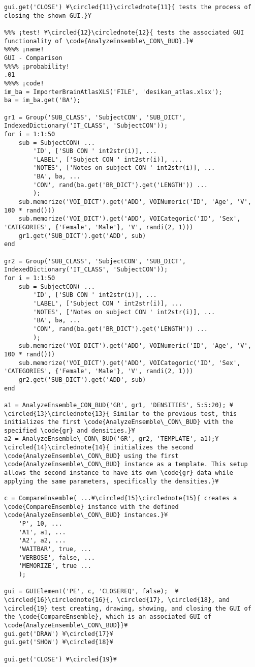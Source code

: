 \documentclass{tufte-handout}
\begin{document}
\begin{lstlisting}
gui.get('CLOSE') ¥\circled{11}\circlednote{11}{ tests the process of closing the shown GUI.}¥

%%% ¡test! ¥\circled{12}\circlednote{12}{ tests the associated GUI functionality of \code{AnalyzeEnsemble\_CON\_BUD}.}¥
%%%% ¡name!
GUI - Comparison
%%%% ¡probability!
.01
%%%% ¡code!
im_ba = ImporterBrainAtlasXLS('FILE', 'desikan_atlas.xlsx');
ba = im_ba.get('BA');

gr1 = Group('SUB_CLASS', 'SubjectCON', 'SUB_DICT', IndexedDictionary('IT_CLASS', 'SubjectCON'));
for i = 1:1:50
    sub = SubjectCON( ...
        'ID', ['SUB CON ' int2str(i)], ...
        'LABEL', ['Subject CON ' int2str(i)], ...
        'NOTES', ['Notes on subject CON ' int2str(i)], ...
        'BA', ba, ...
        'CON', rand(ba.get('BR_DICT').get('LENGTH')) ...
        );
    sub.memorize('VOI_DICT').get('ADD', VOINumeric('ID', 'Age', 'V', 100 * rand()))
    sub.memorize('VOI_DICT').get('ADD', VOICategoric('ID', 'Sex', 'CATEGORIES', {'Female', 'Male'}, 'V', randi(2, 1)))
    gr1.get('SUB_DICT').get('ADD', sub)
end

gr2 = Group('SUB_CLASS', 'SubjectCON', 'SUB_DICT', IndexedDictionary('IT_CLASS', 'SubjectCON'));
for i = 1:1:50
    sub = SubjectCON( ...
        'ID', ['SUB CON ' int2str(i)], ...
        'LABEL', ['Subject CON ' int2str(i)], ...
        'NOTES', ['Notes on subject CON ' int2str(i)], ...
        'BA', ba, ...
        'CON', rand(ba.get('BR_DICT').get('LENGTH')) ...
        );
    sub.memorize('VOI_DICT').get('ADD', VOINumeric('ID', 'Age', 'V', 100 * rand()))
    sub.memorize('VOI_DICT').get('ADD', VOICategoric('ID', 'Sex', 'CATEGORIES', {'Female', 'Male'}, 'V', randi(2, 1)))
    gr2.get('SUB_DICT').get('ADD', sub)
end

a1 = AnalyzeEnsemble_CON_BUD('GR', gr1, 'DENSITIES', 5:5:20); ¥\circled{13}\circlednote{13}{ Similar to the previous test, this initializes the first \code{AnalyzeEnsemble\_CON\_BUD} with the specified \code{gr} and densities.}¥
a2 = AnalyzeEnsemble\_CON\_BUD('GR', gr2, 'TEMPLATE', a1);¥\circled{14}\circlednote{14}{ initializes the second \code{AnalyzeEnsemble\_CON\_BUD} using the first \code{AnalyzeEnsemble\_CON\_BUD} instance as a template. This setup allows the second instance to have its own \code{gr} data while applying the same parameters, specifically the densities.}¥

c = CompareEnsemble( ...¥\circled{15}\circlednote{15}{ creates a \code{CompareEnsemble} instance with the defined \code{AnalyzeEnsemble\_CON\_BUD} instances.}¥
    'P', 10, ...
    'A1', a1, ...
    'A2', a2, ...
    'WAITBAR', true, ...
    'VERBOSE', false, ...
    'MEMORIZE', true ...
    );

gui = GUIElement('PE', c, 'CLOSEREQ', false);  ¥\circled{16}\circlednote{16}{, \circled{17}, \circled{18}, and \circled{19} test creating, drawing, showing, and closing the GUI of the \code{CompareEnsemble}, which is an associated GUI of \code{AnalyzeEnsemble\_CON\_BUD}}¥
gui.get('DRAW') ¥\circled{17}¥
gui.get('SHOW') ¥\circled{18}¥

gui.get('CLOSE') ¥\circled{19}¥

\end{lstlisting}
\end{document}
